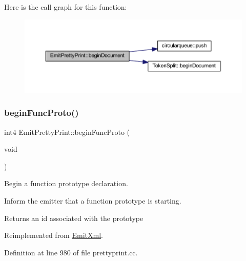 Here is the call graph for this function\+:
\nopagebreak
\begin{figure}[H]
\begin{center}
\leavevmode
\includegraphics[width=350pt]{class_emit_pretty_print_a7d26817d23a381a55e78d4c7caf225f1_cgraph}
\end{center}
\end{figure}
\mbox{\label{class_emit_pretty_print_a242bc11dbb30efeb41f7e4ad39169450}} 
\subsubsection{\texorpdfstring{beginFuncProto()}{beginFuncProto()}}
{\footnotesize\ttfamily int4 Emit\+Pretty\+Print\+::begin\+Func\+Proto (\begin{DoxyParamCaption}\item[{void}]{ }\end{DoxyParamCaption})\hspace{0.3cm}{\ttfamily [virtual]}}



Begin a function prototype declaration. 

Inform the emitter that a function prototype is starting. \begin{DoxyReturn}{Returns}
an id associated with the prototype 
\end{DoxyReturn}


Reimplemented from \mbox{\hyperlink{class_emit_xml_acaf7a29dd1eb427f20e99dccf3581f59}{Emit\+Xml}}.



Definition at line 980 of file prettyprint.\+cc.

